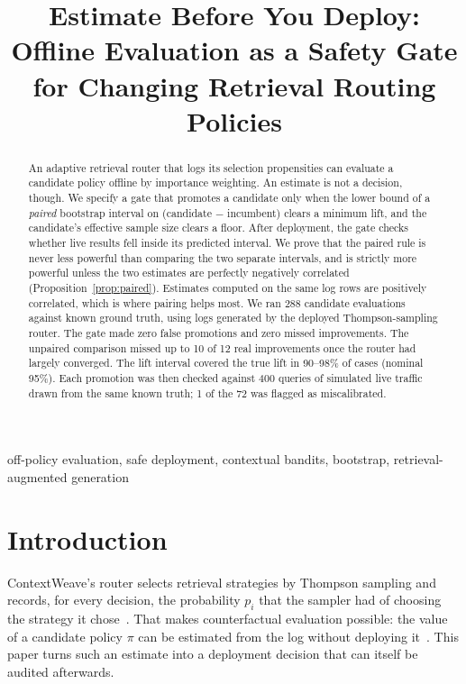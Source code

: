 \documentclass[conference]{IEEEtran}
\begin{document}
\title{Estimate Before You Deploy: Offline Evaluation as a Safety Gate for Changing Retrieval Routing Policies}

\author{
}

\maketitle

\begin{abstract}
An adaptive retrieval router that logs its selection propensities can evaluate a candidate policy offline by importance weighting. An estimate is not a decision, though. We specify a gate that promotes a candidate only when the lower bound of a \emph{paired} bootstrap interval on (candidate $-$ incumbent) clears a minimum lift, and the candidate's effective sample size clears a floor. After deployment, the gate checks whether live results fell inside its predicted interval. We prove that the paired rule is never less powerful than comparing the two separate intervals, and is strictly more powerful unless the two estimates are perfectly negatively correlated (Proposition~\ref{prop:paired}). Estimates computed on the same log rows are positively correlated, which is where pairing helps most. We ran 288 candidate evaluations against known ground truth, using logs generated by the deployed Thompson-sampling router. The gate made zero false promotions and zero missed improvements. The unpaired comparison missed up to 10 of 12 real improvements once the router had largely converged. The lift interval covered the true lift in 90--98\% of cases (nominal 95\%). Each promotion was then checked against 400 queries of simulated live traffic drawn from the same known truth; 1 of the 72 was flagged as miscalibrated.
\end{abstract}

\begin{IEEEkeywords}
off-policy evaluation, safe deployment, contextual bandits, bootstrap, retrieval-augmented generation
\end{IEEEkeywords}

\section{Introduction}
ContextWeave's router selects retrieval strategies by Thompson sampling and records, for every decision, the probability $p_i$ that the sampler had of choosing the strategy it chose~\cite{prior-router}. That makes counterfactual evaluation possible: the value of a candidate policy $\pi$ can be estimated from the log without deploying it~\cite{horvitz1952,dudik2011}. This paper turns such an estimate into a deployment decision that can itself be audited afterwards.
\end{document}
